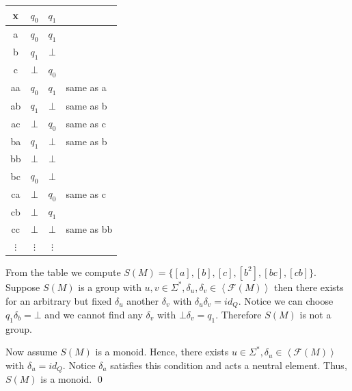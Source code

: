 \documentclass[a4paper,12pt,numbers=noenddot]{scrreport}
\def\lsk{\left<}
\def\rsk{\right>}
\begin{document}
\chapter{}
\section{}
\section{}
\section{}
\begin{center}
\begin{tabular}{c|cc|l}
x & $q_0$ & $q_1$   \\ \hline
a & $q_0$ & $q_1$   \\
b & $q_1$ & $\bot$  \\
c & $\bot$ & $q_0$  \\ \hline
aa & $q_0$ & $q_1$ & same as a \\ 
ab & $q_1$ & $\bot$ & same as b \\ 
ac & $\bot$ & $q_0$ & same as c \\ 
ba & $q_1$ & $\bot$ & same as b \\ 
bb & $\bot$ & $\bot$ \\ 
bc & $q_0$ & $\bot$ \\ 
ca & $\bot$ & $q_0$ & same as c \\ 
cb & $\bot$ & $q_1$ \\ 
cc & $\bot$ & $\bot$ & same as bb \\ \hline
$\vdots$ & $\vdots$ & $\vdots$ & \\
\end{tabular}
\end{center}
From the table we compute $S(M) = \{[a], [b], [c], [b^2], [bc], [cb]\}$.
Suppose $S(M)$ is a group with $u,v \in \Sigma^*, \delta_u, \delta_v \in \lsk \mathcal{F}(M) \rsk$ then there exists for an arbitrary but fixed $\delta_u$ another $\delta_v$ with $\delta_u \delta_v = id_Q$.
Notice we can choose $q_1\delta_b = \bot$ and we cannot find any $\delta_v$ with $\bot \delta_v = q_1$.
Therefore $S(M)$ is not a group.

Now assume $S(M)$ is a monoid.
Hence, there exists $u \in \Sigma^*, \delta_u \in \lsk \mathcal{F}(M) \rsk$ with $\delta_u = id_Q$.
Notice $\delta_a$ satisfies this condition and acts a neutral element.
Thus, $S(M)$ is a monoid.
\qed
\end{document}
